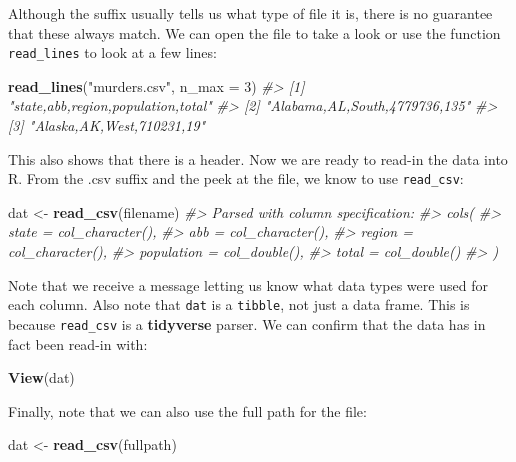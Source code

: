 \documentclass[
]{krantz}
\newenvironment{Shaded}{\begin{snugshade}}{\end{snugshade}}
\newcommand{\CommentTok}[1]{\textcolor[rgb]{0.37,0.37,0.37}{\textit{#1}}}
\newcommand{\DataTypeTok}[1]{\textcolor[rgb]{0.27,0.27,0.27}{#1}}
\newcommand{\DecValTok}[1]{\textcolor[rgb]{0.06,0.06,0.06}{#1}}
\newcommand{\KeywordTok}[1]{\textcolor[rgb]{0.27,0.27,0.27}{\textbf{#1}}}
\newcommand{\NormalTok}[1]{#1}
\newcommand{\StringTok}[1]{\textcolor[rgb]{0.5,0.5,0.5}{#1}}
\begin{document}
Although the suffix usually tells us what type of file it is, there is no guarantee that these always match. We can open the file to take a look or use the function \texttt{read\_lines} to look at a few lines:

\begin{Shaded}
\begin{Highlighting}[]
\KeywordTok{read_lines}\NormalTok{(}\StringTok{"murders.csv"}\NormalTok{, }\DataTypeTok{n_max =} \DecValTok{3}\NormalTok{)}
\CommentTok{#> [1] "state,abb,region,population,total"}
\CommentTok{#> [2] "Alabama,AL,South,4779736,135"     }
\CommentTok{#> [3] "Alaska,AK,West,710231,19"}
\end{Highlighting}
\end{Shaded}

This also shows that there is a header. Now we are ready to read-in the data into R. From the .csv suffix and the peek at the file, we know to use \texttt{read\_csv}:

\begin{Shaded}
\begin{Highlighting}[]
\NormalTok{dat <-}\StringTok{ }\KeywordTok{read_csv}\NormalTok{(filename)}
\CommentTok{#> Parsed with column specification:}
\CommentTok{#> cols(}
\CommentTok{#>   state = col_character(),}
\CommentTok{#>   abb = col_character(),}
\CommentTok{#>   region = col_character(),}
\CommentTok{#>   population = col_double(),}
\CommentTok{#>   total = col_double()}
\CommentTok{#> )}
\end{Highlighting}
\end{Shaded}

Note that we receive a message letting us know what data types were used for each column.
Also note that \texttt{dat} is a \texttt{tibble}, not just a data frame. This is because \texttt{read\_csv} is a \textbf{tidyverse} parser. We can confirm that the data has in fact been read-in with:

\begin{Shaded}
\begin{Highlighting}[]
\KeywordTok{View}\NormalTok{(dat)}
\end{Highlighting}
\end{Shaded}

Finally, note that we can also use the full path for the file:

\begin{Shaded}
\begin{Highlighting}[]
\NormalTok{dat <-}\StringTok{ }\KeywordTok{read_csv}\NormalTok{(fullpath)}
\end{Highlighting}
\end{Shaded}
\end{document}
